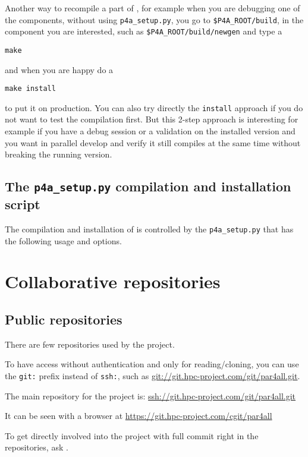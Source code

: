 \documentclass[a4paper]{article}
\begin{document}
Another way to recompile a part of \Apfa, for example when you are
debugging one of the components, without using \verb|p4a_setup.py|, you go to
\verb|$P4A_ROOT/build|, in the component you are interested, such as
\verb|$P4A_ROOT/build/newgen| and type a
\begin{verbatim}
make
\end{verbatim}
and when you are happy do a
\begin{verbatim}
make install
\end{verbatim}
to put it on production. You can also try directly the \texttt{install}
approach if you do not want to test the compilation first. But this 2-step
approach is interesting for example if you have a debug session or a
validation on the installed version and you want in parallel develop and
verify it still compiles at the same time without breaking the running
version.


\subsection{The \protect\texttt{p4a\_setup.py} compilation and installation
script}
\label{sec:p4a_s-comp-script}

The compilation and installation of \Apfa is controlled by the
\verb|p4a_setup.py| that has the following usage and options.




\section{Collaborative repositories}
\label{sec:coll-repos}


\subsection{Public repositories}
\label{sec:public-repositories}

There are few \Agit repositories used by the project.

To have access without authentication and only for reading/cloning, you
can use the \texttt{git:} prefix instead of \texttt{ssh:}, such as
\url{git://git.hpc-project.com/git/par4all.git}.

The main repository for the project is:
\url{ssh://git.hpc-project.com/git/par4all.git}

It can be seen with a \Awww browser at
\url{https://git.hpc-project.com/cgit/par4all}

To get directly involved into the project with full commit right in the
repositories, ask \Ahpcp.
\end{document}
